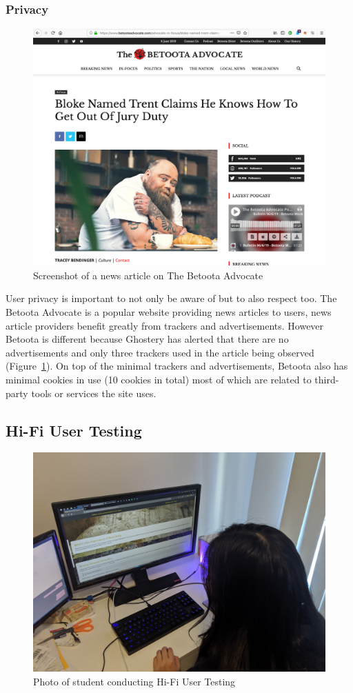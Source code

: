 \subsubsection{Privacy}
\begin{figure}[H]
	\centering
	\includegraphics[width=0.7\linewidth]{betoota}
	\caption{Screenshot of a news article on The Betoota Advocate}\label{fig:betoota}
\end{figure}
User privacy is important to not only be aware of but to also respect too. The Betoota Advocate is a popular website providing news articles to users, news article providers benefit greatly from trackers and advertisements. However Betoota is different because Ghostery has alerted that there are no advertisements and only three trackers used in the article being observed (Figure~\ref{fig:betoota}). On top of the minimal trackers and advertisements, Betoota also has minimal cookies in use (10 cookies in total) most of which are related to third-party tools or services the site uses.

\subsection{Hi-Fi User Testing}
\begin{figure}
	\centering
	\includegraphics[width=0.8\linewidth]{hifi}	
	\caption{Photo of student conducting Hi-Fi User Testing}\label{fig:hifi}
\end{figure}

